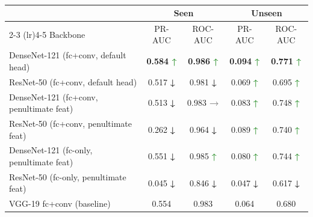 \documentclass{article}
\begin{document}
\setcounter{table}{6}
\begin{table}[t]
\centering
\small
\setlength{\tabcolsep}{5pt}
\renewcommand{\arraystretch}{1.15}
\begin{threeparttable}
\caption{}
\label{tab:innov_backbone}
\begin{tabular}{l c c c c}
\toprule
 & \multicolumn{2}{c}{Seen} & \multicolumn{2}{c}{Unseen} \\
\cmidrule(lr){2-3} \cmidrule(lr){4-5}
Backbone & {PR-AUC} & {ROC-AUC} & {PR-AUC} & {ROC-AUC} \\
\midrule
DenseNet-121 (fc+conv, default head) & \bfseries 0.584 \textcolor{ForestGreen}{\textbf{↑}} & \bfseries 0.986 \textcolor{ForestGreen}{\textbf{↑}} & \bfseries 0.094 \textcolor{ForestGreen}{\textbf{↑}} & \bfseries 0.771 \textcolor{ForestGreen}{\textbf{↑}} \\
ResNet-50 (fc+conv, default head) & 0.517 \textcolor{BrickRed}{\textbf{↓}} & 0.981 \textcolor{BrickRed}{\textbf{↓}} & 0.069 \textcolor{ForestGreen}{\textbf{↑}} & 0.695 \textcolor{ForestGreen}{\textbf{↑}} \\
DenseNet-121 (fc+conv, penultimate feat) & 0.513 \textcolor{BrickRed}{\textbf{↓}} & 0.983 \textcolor{gray}{\textbf{→}} & 0.083 \textcolor{ForestGreen}{\textbf{↑}} & 0.748 \textcolor{ForestGreen}{\textbf{↑}} \\
ResNet-50 (fc+conv, penultimate feat) & 0.262 \textcolor{BrickRed}{\textbf{↓}} & 0.964 \textcolor{BrickRed}{\textbf{↓}} & 0.089 \textcolor{ForestGreen}{\textbf{↑}} & 0.740 \textcolor{ForestGreen}{\textbf{↑}} \\
DenseNet-121 (fc-only, penultimate feat) & 0.551 \textcolor{BrickRed}{\textbf{↓}} & 0.985 \textcolor{ForestGreen}{\textbf{↑}} & 0.080 \textcolor{ForestGreen}{\textbf{↑}} & 0.744 \textcolor{ForestGreen}{\textbf{↑}} \\
ResNet-50 (fc-only, penultimate feat) & 0.045 \textcolor{BrickRed}{\textbf{↓}} & 0.846 \textcolor{BrickRed}{\textbf{↓}} & 0.047 \textcolor{BrickRed}{\textbf{↓}} & 0.617 \textcolor{BrickRed}{\textbf{↓}} \\
\midrule
VGG-19 fc+conv (baseline) & 0.554 & 0.983 & 0.064 & 0.680 \\
\bottomrule
\end{tabular}
\end{threeparttable}
\end{table}
\end{document}
